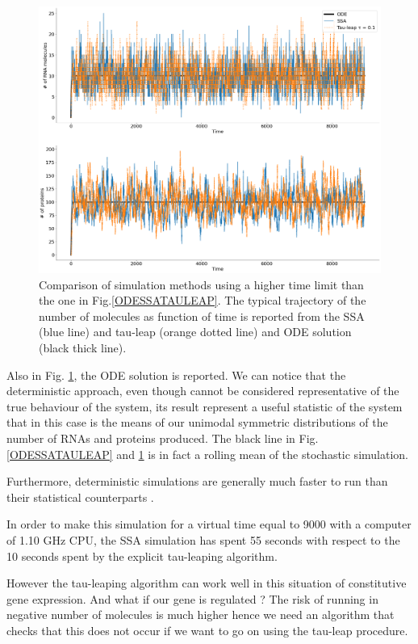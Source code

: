 \documentclass[12pt,a4paper]{report}
\begin{document}
\begin{figure}[!ht]
\centering
\includegraphics[scale=0.30]{ODESSATauleaptimeplot9000.png}
\caption{Comparison of simulation methods using a higher time limit than the one in Fig.\ref{ODESSATAULEAP}. The typical trajectory of the number of molecules as function of time is reported from the SSA (blue line) and tau-leap (orange dotted line) and ODE solution (black thick line).}
\label{ODESSATauleaptimeplot9000}
\end{figure}
\newpage
Also in Fig. \ref{ODESSATauleaptimeplot9000}, the ODE solution is reported. We can notice that the deterministic approach, even though cannot be considered representative of the true behaviour of the system, its result represent a useful statistic of the system that in this case is the means of our unimodal symmetric distributions of the number of RNAs and proteins produced. The black line in Fig. \ref{ODESSATAULEAP} and \ref{ODESSATauleaptimeplot9000} is in fact a rolling mean of the stochastic simulation.

Furthermore, deterministic simulations are generally much faster to run than their statistical counterparts \cite{Article}.

In order to make this simulation for a virtual time equal to 9000 with a computer of 1.10 GHz CPU, the SSA simulation has spent 55 seconds with respect to the 10 seconds spent by the explicit tau-leaping algorithm. 

However the tau-leaping algorithm can work well in this situation of constitutive gene expression. And what if our gene is regulated ? The risk of running in negative number of molecules is much higher hence we need an algorithm that checks that this does not occur if we want to go on using the tau-leap procedure.
\end{document}
